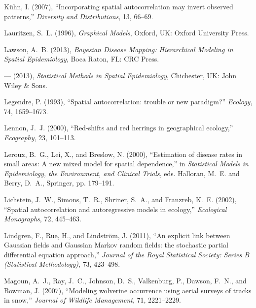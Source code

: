 \documentclass[11pt, titlepage]{article}\usepackage[]{graphicx}\usepackage[]{color}
\begin{document}
\begin{spacing}{1.9}
\begin{flushleft}
\begin{thebibliography}{126}
K{\"u}hn, I. (2007), \enquote{Incorporating spatial autocorrelation may invert
  observed patterns,} \textit{Diversity and Distributions}, 13, 66--69.

Lauritzen, S.~L. (1996), \textit{Graphical Models}, Oxford, UK: Oxford
  University Press.

Lawson, A.~B. (2013{}), \textit{Bayesian Disease Mapping:
  Hierarchical Modeling in Spatial Epidemiology}, Boca Raton, FL: CRC Press.

--- (2013{}), \textit{Statistical Methods in Spatial Epidemiology},
  Chichester, UK: John Wiley \& Sons.

Legendre, P. (1993), \enquote{Spatial autocorrelation: trouble or new
  paradigm?} \textit{Ecology}, 74, 1659--1673.

Lennon, J.~J. (2000), \enquote{Red-shifts and red herrings in geographical
  ecology,} \textit{Ecography}, 23, 101--113.

Leroux, B.~G., Lei, X., and Breslow, N. (2000), \enquote{Estimation of disease
  rates in small areas: A new mixed model for spatial dependence,} in
  \textit{Statistical Models in Epidemiology, the Environment, and Clinical
  Trials}, eds. Halloran, M.~E. and Berry, D.~A., Springer, pp. 179--191.

Lichstein, J.~W., Simons, T.~R., Shriner, S.~A., and Franzreb, K.~E. (2002),
  \enquote{Spatial autocorrelation and autoregressive models in ecology,}
  \textit{Ecological Monographs}, 72, 445--463.

Lindgren, F., Rue, H., and Lindstr{\"o}m, J. (2011), \enquote{An explicit link
  between {G}aussian fields and {G}aussian {M}arkov random fields: the
  stochastic partial differential equation approach,} \textit{Journal of the
  Royal Statistical Society: Series B (Statistical Methodology)}, 73, 423--498.

Magoun, A.~J., Ray, J.~C., Johnson, D.~S., Valkenburg, P., Dawson, F.~N., and
  Bowman, J. (2007), \enquote{Modeling wolverine occurrence using aerial
  surveys of tracks in snow,} \textit{Journal of Wildlife Management}, 71,
  2221--2229.


\end{thebibliography}
\end{flushleft}
\end{spacing}
\end{document}
